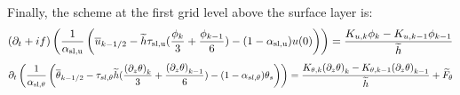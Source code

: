 Finally, the scheme at the first grid level above
the surface layer is:
\begin{equation}
	\label{eq:ND_Ocean_semiDiscreteEkmanEqFVfree}
	(\partial_t+if) \left(\frac{1}{\alpha_{\rm sl, u}}
	\left(\overline{u}_{k-1/2} - \widetilde{h}\tau_{\rm sl, u}
	(\frac{\phi_k}{3} + \frac{\phi_{k-1}}{6}) - 
	(1-\alpha_{\rm sl, u})u(0)\right)\right)
	= \frac{K_{u, k}\phi_{k} - K_{u,k-1} \phi_{k-1}}{\widetilde{h}}
\end{equation}
\begin{equation}
	\label{eq:ND_Ocean_semiDiscreteEkmanEqPTFVfree}
	\partial_t \left(\frac{1}{\alpha_{\rm sl, \theta}}
	\left(
	\overline{\theta}_{k-1/2} - \tau_{sl, \theta}
	\widetilde{h}(\frac{{(\partial_z \theta)}_k}{3} +
	\frac{{(\partial_z \theta)}_{k-1}}{6})
	 - (1 - \alpha_{sl, \theta})\theta_s
	\right) \right)
	= \frac{K_{\theta, k}{(\partial_z \theta)}_{k} -
	K_{\theta,k-1} {(\partial_z \theta)}_{k-1}}{\widetilde{h}}
	+ \widetilde{F}_\theta 
\end{equation}
